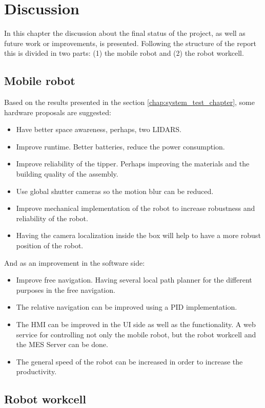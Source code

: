 \chapter{Discussion}
\label{chap:discussion}
In this chapter the discussion about the final status of the project, as well as future work or improvements, is presented.
Following the structure of the report this is divided in two parts: (1) the mobile robot and (2) the robot workcell.

	\section{Mobile robot} %
	\label{sub:mobile_robot}
	Based on the results presented in the section \ref{chap:system_test_chapter}, some hardware proposals are suggested:
	\begin{itemize}
		\item Have better space awareness, perhaps, two LIDARS.
		\item Improve runtime. Better batteries, reduce the power consumption.
		\item Improve reliability of the tipper. Perhaps improving the materials and the building quality of the assembly.
		\item Use global shutter cameras so the motion blur can be reduced.
		\item Improve mechanical implementation of the robot to increase robustness and reliability of the robot.
		\item  Having the camera localization inside the box will help to have a more robust position of the robot.
	\end{itemize}
	And as an improvement in the software side:
	\begin{itemize}
		\item Improve free navigation. Having several local path planner for the different purposes in the free navigation.
		\item The relative navigation can be improved using a PID implementation.
		\item The HMI can be improved in the UI side as well as the functionality. A web service for controlling not only the mobile robot, but the robot workcell and the MES Server can be done.
		\item The general speed of the robot can be increased in order to increase the productivity.
	\end{itemize}

	\section{Robot workcell} %
	\label{sub:robot_workcell}
